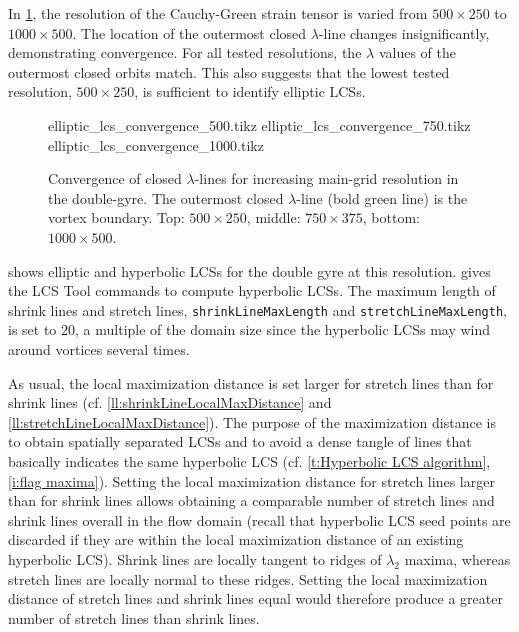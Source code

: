 \documentclass[5p]{elsarticle}
\newlength\figurewidth
\begin{document}


In \cref{f:double gyre lambda LCS convergence}, the resolution of the  Cauchy-Green strain tensor is varied from $500 \times 250$ to $1000 \times 500$. The location of the outermost closed $\lambda$-line changes insignificantly, demonstrating convergence. For all tested resolutions, the $\lambda$ values of the outermost closed orbits match.
This also suggests that the lowest tested resolution, $500 \times 250$, is sufficient to identify elliptic LCSs.

\begin{figure}
\centering
\setlength{}
{elliptic_lcs_convergence_500.tikz}
{elliptic_lcs_convergence_750.tikz}
{elliptic_lcs_convergence_1000.tikz}
\caption{Convergence of closed $\lambda$-lines for increasing main-grid resolution in the double-gyre. The outermost closed $\lambda$-line (bold green line) is the vortex boundary. Top: $500 \times 250$, middle: $750 \times 375$, bottom: $1000 \times 500$.}
\label{f:double gyre lambda LCS convergence}
\end{figure}

 shows elliptic and hyperbolic LCSs for the double gyre at this resolution.
 gives the LCS Tool commands to compute hyperbolic LCSs.
The maximum length of shrink lines and stretch lines, \lstinline!shrinkLineMaxLength! and \lstinline!stretchLineMaxLength!, is set to $20$, a multiple of the domain size since the hyperbolic LCSs may wind around vortices several times.

As usual, the local maximization distance is set larger for stretch lines than for shrink lines (cf. \cref{ll:shrinkLineLocalMaxDistance} and \cref{ll:stretchLineLocalMaxDistance}). The purpose of the maximization distance is to obtain spatially separated LCSs and to avoid a dense tangle of lines that basically indicates the same hyperbolic LCS (cf. \cref{t:Hyperbolic LCS algorithm}, \cref{i:flag maxima}). Setting the local maximization distance for stretch lines larger than for shrink lines allows obtaining a comparable number of stretch lines and shrink lines overall in the flow domain (recall that hyperbolic LCS seed points are discarded if they are within the local maximization distance of an existing hyperbolic LCS). Shrink lines are locally tangent to ridges of $\lambda_2$ maxima, whereas stretch lines are locally normal to these ridges. Setting the local maximization distance of stretch lines and shrink lines equal would therefore produce a greater number of stretch lines than shrink lines.
\end{document}
